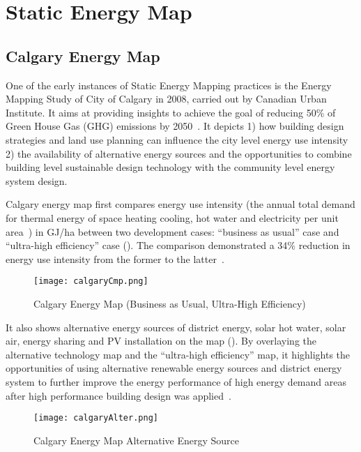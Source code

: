 \section{Static Energy Map}\label{staticEnergyMap}
\subsection{Calgary Energy Map}
One of the early instances of Static Energy Mapping practices is the
Energy Mapping Study of City of Calgary in 2008, carried out by
Canadian Urban Institute. It aims at providing insights to achieve
the goal of reducing 50\% of Green House Gas (GHG) emissions by
2050~\cite{aacip2009}. It depicts 1) how building design strategies
and land use planning can influence the city level energy use
intensity 2) the availability of alternative energy sources and the
opportunities to combine building level sustainable design technology
with the community level energy system design. 

Calgary energy map first compares energy use intensity (the annual
total demand for thermal energy of space heating cooling, hot water
and electricity per unit area~\cite{aacip2009}) in GJ/ha between two
development cases: ``business as usual'' case and ``ultra-high
efficiency'' case (). The comparison demonstrated
a 34\% reduction in energy use intensity from the former to the
latter~\cite{aacip2009}.

\begin{figure}[h!]
  \centering
  \texttt{[image: calgaryCmp.png]}
  \caption[Calgary Energy Demand Map]{Calgary Energy Map (Business as Usual, Ultra-High
    Efficiency)~\cite{aacip2009}}
  \label{fig:calgaryCmp}
\end{figure}

It also shows alternative energy sources of district energy, solar hot
water, solar air, energy sharing and PV installation on the map
(). By overlaying the alternative technology
map and the ``ultra-high efficiency'' map, it highlights the
opportunities of using alternative renewable energy sources and
district energy system to further improve the energy performance of
high energy demand areas after high performance building design was
applied~\cite{aacip2009}.

\begin{figure}[h!]
  \centering
  \texttt{[image: calgaryAlter.png]}
  \caption{Calgary Energy Map Alternative Energy Source~\cite{aacip2009}}
  \label{fig:calgaryAlter}
\end{figure}


